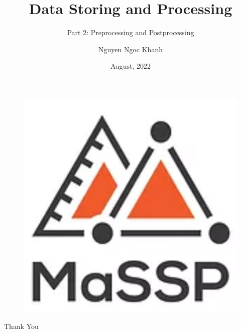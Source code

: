 \documentclass{beamer}
\author{Nguyen Ngoc Khanh}
\title{Data Storing and Processing}
\subtitle{Part 2: Preprocessing and Postprocessing}
\institute{
    MaSSP DS 2022
}
\date{August, 2022}
\begin{document}
\begin{frame}
    \titlepage
    \begin{figure}[htpb]
        \begin{center}
            \includegraphics[keepaspectratio, scale=0.2]{assets/massp_logo.png}
        \end{center}
    \end{figure}
\end{frame}

\begin{frame}
    \tableofcontents[sectionstyle=show,subsectionstyle=show/shaded/hide,subsubsectionstyle=show/shaded/hide]
\end{frame}








\begin{frame}
    \begin{center}
        {\Huge\calligra Thank You}
    \end{center}
\end{frame}


\end{document}
